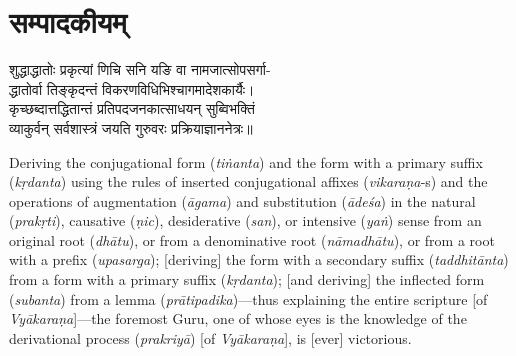 %
%
%

\renewcommand\chaptername{}
\chapter[सम्पादकीयम्]{सम्पादकीयम्}
\fontsize{14}{21}\selectfont
\renewcommand{\thefootnote}{\small{\engtextfont \arabic{footnote}}}
\begin{center}
शुद्धाद्धातोः प्रकृत्यां णिचि सनि यङि वा नामजात्सोपसर्गा-\nopagebreak\\
द्धातोर्वा तिङ्कृदन्तं विकरणविधिभिश्चागमादेशकार्यैः।\\
कृच्छब्दात्तद्धितान्तं प्रतिपदजनकात्साधयन् सुब्विभक्तिं\nopagebreak\\
व्याकुर्वन् सर्वशास्त्रं जयति गुरुवरः प्रक्रियाज्ञाननेत्रः॥\\
\end{center}
\begin{sloppypar}\justifying\noindent\hspace{10mm} {\engtextfont \lqtwo Deriving the conjugational form (\textit{tiṅanta}) and the form with a primary suffix (\textit{kṛdanta}) using the rules of inserted conjugational affixes (\textit{vikaraṇa}‑s) and the operations of augmentation (\textit{āgama}) and substitution (\textit{ādeśa}) in the natural (\textit{prakṛti}), causative (\textit{ṇic}), desiderative (\textit{san}), or intensive (\textit{yaṅ}) sense from an original root (\textit{dhātu}), or from a denominative root (\textit{nāmadhātu}), or from a root with a prefix (\textit{upasarga}); [deriving] the form with a secondary suffix (\textit{taddhitānta}) from a form with a primary suffix (\textit{kṛdanta}); [and deriving] the inflected form (\textit{subanta}) from a lemma (\textit{prātipadika})—thus explaining the entire scripture [of \textit{Vyākaraṇa}]—the foremost Guru, one of whose eyes is the knowledge of the derivational process (\textit{prakriyā}) [of \textit{Vyākaraṇa}], is [ever] victorious.\rqtwo}\end{sloppypar}
